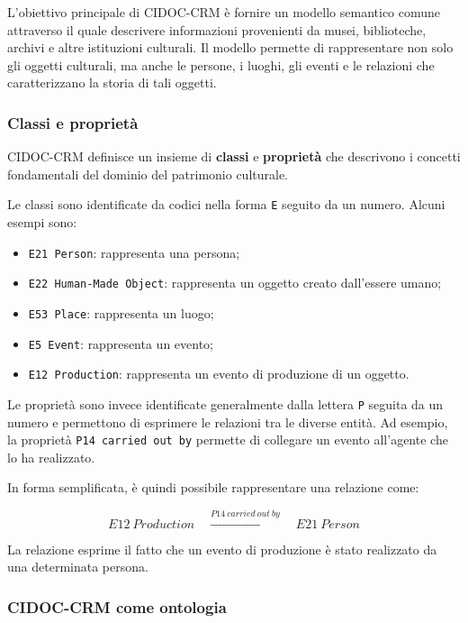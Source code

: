 L'obiettivo principale di CIDOC-CRM è fornire un modello semantico comune
attraverso il quale descrivere informazioni provenienti da musei,
biblioteche, archivi e altre istituzioni culturali. Il modello permette
di rappresentare non solo gli oggetti culturali, ma anche le persone, i
luoghi, gli eventi e le relazioni che caratterizzano la storia di tali
oggetti.

\subsubsection{Classi e proprietà}

CIDOC-CRM definisce un insieme di \textbf{classi} e
\textbf{proprietà} che descrivono i concetti fondamentali del dominio
del patrimonio culturale.

Le classi sono identificate da codici nella forma \texttt{E} seguito da
un numero. Alcuni esempi sono:

\begin{itemize}
    \item \texttt{E21 Person}: rappresenta una persona;
    \item \texttt{E22 Human-Made Object}: rappresenta un oggetto creato
    dall'essere umano;
    \item \texttt{E53 Place}: rappresenta un luogo;
    \item \texttt{E5 Event}: rappresenta un evento;
    \item \texttt{E12 Production}: rappresenta un evento di produzione
    di un oggetto.
\end{itemize}

Le proprietà sono invece identificate generalmente dalla lettera
\texttt{P} seguita da un numero e permettono di esprimere le relazioni
tra le diverse entità. Ad esempio, la proprietà \texttt{P14 carried out
by} permette di collegare un evento all'agente che lo ha realizzato.

In forma semplificata, è quindi possibile rappresentare una relazione
come:

\[
E12\ Production
\quad \xrightarrow{P14\ carried\ out\ by} \quad
E21\ Person
\]

La relazione esprime il fatto che un evento di produzione è stato
realizzato da una determinata persona.

\subsubsection{CIDOC-CRM come ontologia}

